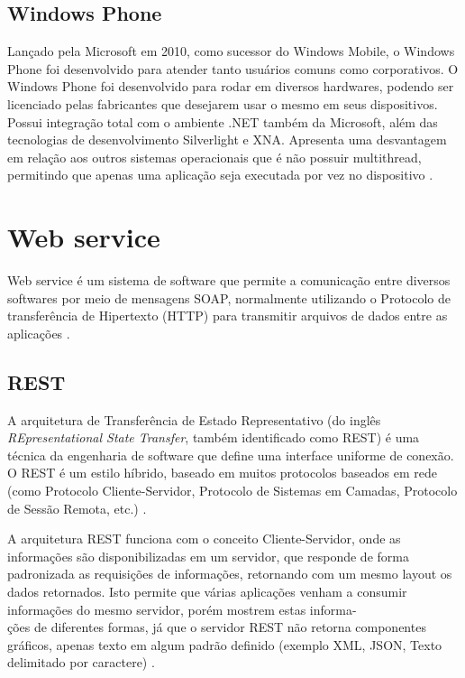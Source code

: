 \subsection{Windows Phone}
Lançado pela Microsoft em 2010, como sucessor do Windows Mobile, o Windows Phone foi desenvolvido para atender tanto usuários comuns como corporativos. O Windows Phone foi desenvolvido para rodar em diversos hardwares, podendo ser licenciado pelas fabricantes que desejarem usar o mesmo em seus dispositivos. Possui integração total com o ambiente .NET também da Microsoft, além das tecnologias de desenvolvimento Silverlight e XNA. Apresenta uma desvantagem em relação aos outros sistemas operacionais que é não possuir multithread, permitindo que apenas uma aplicação seja executada por vez no dispositivo \cite{AvaliacaoComparativaSOMoveis}.

\section{Web service}
Web service é um sistema de software que permite a comunicação entre diversos softwares por meio de mensagens SOAP, normalmente utilizando o Protocolo de transferência de Hipertexto (HTTP) para transmitir arquivos de dados entre as aplicações \cite{W3C}.
\subsection{REST}
A arquitetura de Transferência de Estado Representativo (do inglês \emph{REpresentational State Transfer}, também identificado como REST) é uma técnica da engenharia de software que define uma interface uniforme de conexão. O REST é um estilo híbrido, baseado em muitos protocolos baseados em rede (como Protocolo Cliente-Servidor, Protocolo de Sistemas em Camadas, Protocolo de Sessão Remota, etc.) \cite{RESTFielding}.

A arquitetura REST funciona com o conceito Cliente-Servidor, onde as informações são disponibilizadas em um servidor, que responde de forma padronizada as requisições de informações, retornando com um mesmo layout os dados retornados. Isto permite que várias aplicações venham a consumir informações do mesmo servidor, porém mostrem estas informa- \\ ções de diferentes formas, já que o servidor REST não retorna componentes gráficos, apenas texto em algum padrão definido (exemplo XML, JSON, Texto delimitado por caractere) \cite{RESTFielding}.

